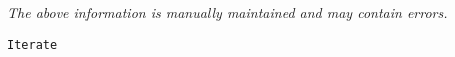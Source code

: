 \label{pkg:iterate}

{\tiny \it The above information is manually maintained and may contain errors.}
\begin{verbatim}
Iterate
\end{verbatim}
